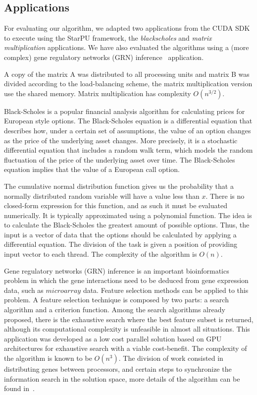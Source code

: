 \documentclass[journal]{IEEEtran}
\begin{document}
\subsection{Applications}

For evaluating our algorithm, we adapted two applications from the CUDA
SDK~\cite{cuda} to execute using the StarPU framework, the \emph{blackscholes} and \emph{matrix
multiplication} applications. We have also evaluated the algorithms using a (more complex) gene regulatory networks (GRN) inference~\cite{borelli2013gene} application.

 A copy of the matrix A was distributed to all processing units and matrix B was divided according to
the load-balancing scheme, the matrix multiplication version use the shared memory. Matrix multiplication has complexity $O(n^{3/2})$.

Black-Scholes is a popular financial analysis algorithm for calculating prices
for European style options. The Black-Scholes equation is a differential
equation that describes how, under a certain set of assumptions, the value of an
option changes as the price of the underlying asset changes. More precisely, it
is a stochastic differential equation that includes a random walk term, which
models the random fluctuation of the price of the underlying asset over time.
The Black-Scholes equation implies that the value of a European call option.


The cumulative normal distribution function gives us the probability that a
normally distributed random variable will have a value less than $x$. There is no
closed-form expression for this function, and as such it must be evaluated
numerically. It is typically approximated using a polynomial function. The idea is to calculate the Black-Scholes the greatest amount of possible options. Thus, the input is a vector of data that the options should be calculated by applying a differential equation. The division of the task is given a position of providing input vector to each thread. The complexity of the algorithm is $O(n)$.


Gene regulatory networks (GRN) inference is an important bioinformatics problem in which the gene interactions need to be deduced from gene expression data, such as $microarray$ data. Feature selection methods can be applied to this problem. A feature selection technique is composed by two parts: a search algorithm and a criterion function. Among the search algorithms already proposed, there is the exhaustive search where the best
feature subset is returned, although its computational complexity is unfeasible in almost all situations. This application was developed as a low cost parallel solution based on GPU architectures for exhaustive search with a viable cost-benefit. The complexity of the algorithm is known to be $O(n^3)$. The division of work consisted in distributing genes between processors, and certain steps to synchronize the information search in the solution space, more details of the algorithm can be found in~\cite{borelli2013gene}.
\end{document}
